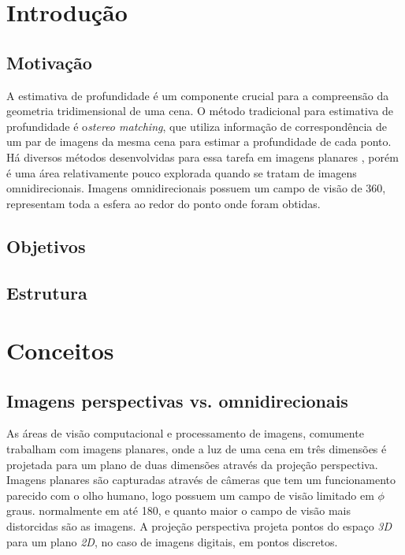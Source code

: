 \documentclass[cic,tc]{iiufrgs}
\begin{document}
\tableofcontents


\chapter{Introdução}

\section{Motivação}

A estimativa de profundidade é um componente crucial para a compreensão da geometria tridimensional de uma cena. O método tradicional para estimativa de profundidade é o\textit{stereo matching}, que utiliza informação de correspondência de um par de imagens da mesma cena para estimar a profundidade de cada ponto.  Há diversos métodos desenvolvidas para essa tarefa em imagens planares , porém é uma área relativamente pouco explorada quando se tratam de imagens omnidirecionais. Imagens omnidirecionais possuem um campo de visão de 360\degree, representam toda a esfera ao redor do ponto onde foram obtidas.

\section{Objetivos}

\section{Estrutura}

\chapter{Conceitos}

\section{Imagens perspectivas vs. omnidirecionais}

As áreas de visão computacional e processamento de imagens, comumente trabalham com imagens planares, onde a luz de uma cena em três dimensões é projetada para um plano de duas dimensões através da projeção perspectiva. Imagens planares são capturadas através de câmeras que tem um funcionamento parecido com o olho humano, logo possuem um campo de visão limitado em $\phi$ graus. normalmente em até 180\degree, e quanto maior o campo de visão mais distorcidas são as imagens. A projeção perspectiva projeta pontos do espaço \textit{3D} para um plano \textit{2D}, no caso de imagens digitais, em pontos discretos. 
\end{document}
